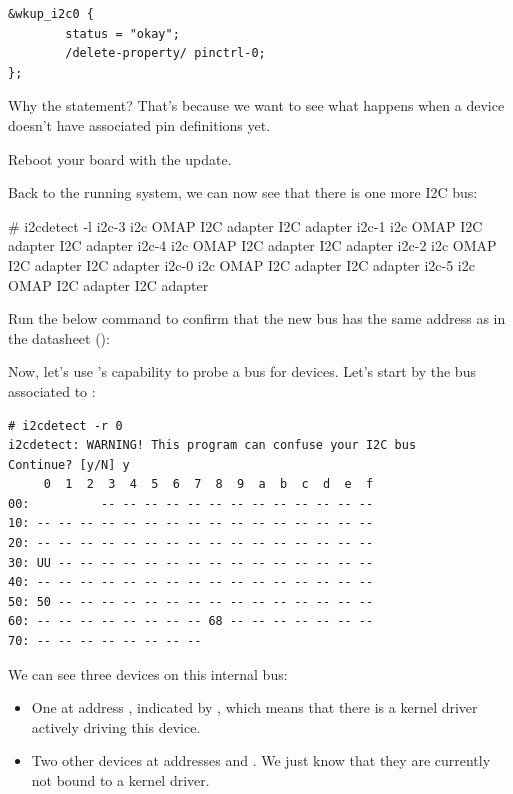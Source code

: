 \begin{verbatim}
&wkup_i2c0 {
        status = "okay";
        /delete-property/ pinctrl-0;
};
\end{verbatim}

Why the  statement? That's because we want to see what happens when a
device doesn't have associated pin definitions yet.

Reboot your board with the update.

Back to the running system, we can now see that there is one more
I2C bus:

\begin{bashinput}
# i2cdetect -l
i2c-3	i2c       	OMAP I2C adapter                	I2C adapter
i2c-1	i2c       	OMAP I2C adapter                	I2C adapter
i2c-4	i2c       	OMAP I2C adapter                	I2C adapter
i2c-2	i2c       	OMAP I2C adapter                	I2C adapter
i2c-0	i2c       	OMAP I2C adapter                	I2C adapter
i2c-5	i2c       	OMAP I2C adapter                	I2C adapter
\end{bashinput}

Run the below command to confirm that the new bus has the same address
as in the datasheet ():


Now, let's use 's capability to probe a bus for devices.
Let's start by the bus associated to :

\begin{verbatim}
# i2cdetect -r 0
i2cdetect: WARNING! This program can confuse your I2C bus
Continue? [y/N] y
     0  1  2  3  4  5  6  7  8  9  a  b  c  d  e  f
00:          -- -- -- -- -- -- -- -- -- -- -- -- --
10: -- -- -- -- -- -- -- -- -- -- -- -- -- -- -- --
20: -- -- -- -- -- -- -- -- -- -- -- -- -- -- -- --
30: UU -- -- -- -- -- -- -- -- -- -- -- -- -- -- --
40: -- -- -- -- -- -- -- -- -- -- -- -- -- -- -- --
50: 50 -- -- -- -- -- -- -- -- -- -- -- -- -- -- --
60: -- -- -- -- -- -- -- -- 68 -- -- -- -- -- -- --
70: -- -- -- -- -- -- -- --
\end{verbatim}

We can see three devices on this internal bus:
\begin{itemize}
\item One at address , indicated by ,
      which means that there is a kernel driver actively
      driving this device.
\item Two other devices at addresses  and .
      We just know that they are currently not bound to a kernel driver.
\end{itemize}

